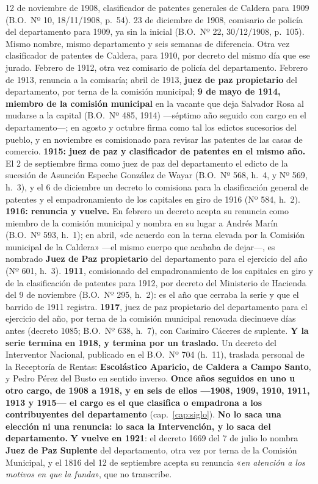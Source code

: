 \begin{personas}
\item[{\textbf{Escolástico M.\ Aparicio\index{Aparicio, Escolástico M.}}}] 12 de noviembre de 1908, clasificador de patentes generales de Caldera para 1909 (B.O.\ Nº 10, 18/11/1908, p.\ 54). 23 de diciembre de 1908, comisario de policía del departamento para 1909, ya sin la inicial (B.O.\ Nº 22, 30/12/1908, p.\ 105). Mismo nombre, mismo departamento y seis semanas de diferencia. Otra vez clasificador de patentes de Caldera, para 1910, por decreto del mismo día que ese jurado. Febrero de 1912, otra vez comisario de policía del departamento. Febrero de 1913, renuncia a la comisaría; abril de 1913, \textbf{juez de paz propietario} del departamento, por terna de la comisión municipal; \textbf{9 de mayo de 1914, miembro de la comisión municipal} en la vacante que deja Salvador Rosa al mudarse a la capital (B.O.\ Nº 485, 1914) ---séptimo año seguido con cargo en el departamento---; en agosto y octubre firma como tal los edictos sucesorios del pueblo, y en noviembre es comisionado para revisar las patentes de las casas de comercio. \textbf{1915: juez de paz y clasificador de patentes en el mismo año.} El 2 de septiembre firma como juez de paz del departamento el edicto de la sucesión de Asunción Espeche González de Wayar (B.O.\ Nº 568, h.\ 4, y Nº 569, h.\ 3), y el 6 de diciembre un decreto lo comisiona para la clasificación general de patentes y el empadronamiento de los capitales en giro de 1916 (Nº 584, h.\ 2). \textbf{1916: renuncia y vuelve.} En febrero un decreto acepta su renuncia como miembro de la comisión municipal y nombra en su lugar a Andrés Marín (B.O.\ Nº 593, h.\ 1); en abril, «de acuerdo con la terna elevada por la Comisión municipal de la Caldera» ---el mismo cuerpo que acababa de dejar---, es nombrado \textbf{Juez de Paz propietario} del departamento para el ejercicio del año (Nº 601, h.\ 3). \textbf{1911}, comisionado del empadronamiento de los capitales en giro y de la clasificación de patentes para 1912, por decreto del Ministerio de Hacienda del 9 de noviembre (B.O.\ Nº 295, h.\ 2): es el año que cerraba la serie y que el barrido de 1911 registra. \textbf{1917}, juez de paz propietario del departamento para el ejercicio del año, por terna de la comisión municipal renovada diecinueve días antes (decreto 1085; B.O.\ Nº 638, h.\ 7), con Casimiro Cáceres de suplente. \textbf{Y la serie termina en 1918, y termina por un traslado.} Un decreto del Interventor Nacional, publicado en el B.O.\ Nº 704 (h.\ 11), traslada personal de la Receptoría de Rentas: \textbf{Escolástico Aparicio, de Caldera a Campo Santo}, y Pedro Pérez del Busto en sentido inverso. \textbf{Once años seguidos en uno u otro cargo, de 1908 a 1918, y en seis de ellos ---1908, 1909, 1910, 1911, 1913 y 1915--- el cargo es el que clasifica o empadrona a los contribuyentes del departamento} (cap.\ \ref{cap:siglo}). \textbf{No lo saca una elección ni una renuncia: lo saca la Intervención, y lo saca del departamento.} \textbf{Y vuelve en 1921}: el decreto 1669 del 7 de julio lo nombra \textbf{Juez de Paz Suplente} del departamento, otra vez por terna de la Comisión Municipal, y el 1816 del 12 de septiembre acepta su renuncia «\textit{en atención a los motivos en que la funda}», que no transcribe. 
\end{personas}
